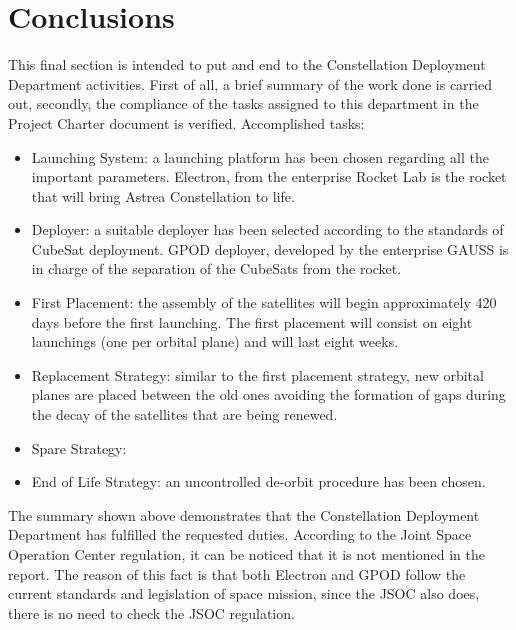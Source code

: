 \section{Conclusions}
This final section is intended to put and end to the Constellation Deployment Department activities. First of all, a brief summary of the work done is carried out, secondly, the compliance of the tasks assigned to this department in the Project Charter document is verified. 
Accomplished tasks: 
\begin{itemize}
\item Launching System: a launching platform has been chosen regarding all the important parameters. Electron, from the enterprise Rocket Lab is the rocket that will bring Astrea Constellation to life. 
\item Deployer: a suitable deployer has been selected according to the standards of CubeSat deployment. GPOD deployer, developed by the enterprise GAUSS is in charge of the separation of the CubeSats from the rocket. 
\item First Placement: the assembly of the satellites will begin approximately 420 days before the first launching. The first placement will consist on eight launchings (one per orbital plane) and will last eight weeks. 
\item Replacement Strategy: similar to the first placement strategy, new orbital planes are placed between the old ones avoiding the formation of gaps during the decay of the satellites that are being renewed.
\item Spare Strategy:
\item End of Life Strategy: an uncontrolled de-orbit procedure has been chosen. 
\end{itemize}
The summary shown above demonstrates that the Constellation Deployment Department has fulfilled the requested duties. According to the Joint Space Operation Center regulation, it can be noticed that it is not mentioned in the report. The reason of this fact is that both Electron and GPOD follow the current standards and legislation of space mission, since the JSOC also does, there is no need to check the JSOC regulation. 